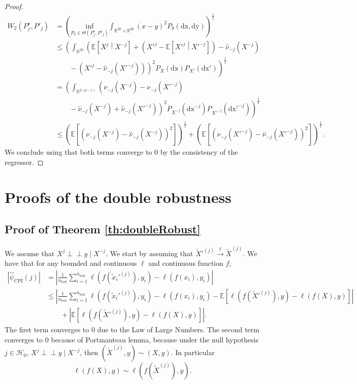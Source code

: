 \documentclass{article}
\theoremstyle{plain}
\theoremstyle{definition}
\theoremstyle{remark}
\newcommand{\e}[1]{\mathbb{E}\left[#1\right]  } %
\newcommand{\indep}{\perp\!\!\!\perp}
\begin{document}
\begin{proof}
    \begin{align*}
        W_2(P^\star_j, P'_j)&=\left(\underset{P_\theta\in\Theta(P^\star_j, P'_j)}{\mathrm{inf}}\int_{\mathbb{R}^{2p}\times \mathbb{R}^{2p}}(x-y)^2P_\theta(\mathrm{dx, dy})\right)^{\frac{1}{2}}\\
        &\leq \left(\int_{\mathbb{R}^{2p}}\left(\e{X^j\middle|X^{-j}}+\left(X'^j-\e{X'^j\middle|X'^{-j}}\right)-\widehat{\nu}_{-j}\left(X^{-j}\right)\right.\right.\\&\left.\left.\qquad-\left(X'^j-\widehat{\nu}_{-j}\left(X'^{-j}\right)\right)\right)^2P_X(\mathrm{dx})P_{X'}(\mathrm{dx}')\right)^{\frac{1}{2}}\\
        &= \left(\int_{\mathbb{R}^{2(p-1)}}\left(\nu_{-j}\left(X^{-j}\right)-\nu_{-j}\left(X'^{-j}\right)\right.\right.\\&\left.\left.\qquad-\widehat{\nu}_{-j}\left(X^{-j}\right)+\widehat{\nu}_{-j}\left(X'^{-j}\right)\right)^2P_{X^{-j}}(\mathrm{dx}^{-j})P_{X'^{-j}}(\mathrm{dx}'^{-j})\right)^{\frac{1}{2}}\\
        &\leq \left(\e{\left(\nu_{-j}\left(X^{-j}\right)-\widehat{\nu}_{-j}\left(X^{-j}\right)\right)^2}\right)^{\frac{1}{2}}+\left(\e{\left(\nu_{-j}\left(X'^{-j}\right)-\widehat{\nu}_{-j}\left(X'^{-j}\right)\right)^2}\right)^{\frac{1}{2}}.
    \end{align*}
    We conclude using that both terms converge to $0$ by the consistency of the regressor. 
\end{proof}

\section{Proofs of the double robustness}

\subsection{Proof of Theorem \ref{th:doubleRobust}}
We assume that $X^j \indep y \mid X^{-j}$. We start by assuming that $\widetilde{X}'^{(j)} \overset{\ell}{\to} \widetilde{X}^{(j)}$. 
We have that for any bounded and continuous $\ell$ and continuous function $f$, 
\begin{align*}
\left|\widehat{\psi}_\mathrm{CPI}(j)\right|&=\left| \frac{1}{n_{\mathrm{test}}}\sum_{i=1}^{n_{\mathrm{test}}}\ell\left(f(\widetilde{x}_{i}'^{(j)}),y_i\right)-\ell\left(f(x_{i}), y_i\right)\right|\\
&\leq \left| \frac{1}{n_{\mathrm{test}}}\sum_{i=1}^{n_{\mathrm{test}}}\ell\left(f(\widetilde{x}_{i}'^{(j)}),y_i\right)-\ell\left(f(x_{i}), y_i\right)-\e{\ell\left(f(\widetilde{X}'^{(j)}),y\right)-\ell\left(f(X), y\right)}\right|\\
&\qquad+\left|\e{\ell\left(f(\widetilde{X}'^{(j)}),y\right)-\ell\left(f(X), y\right)}\right|.
\end{align*}
The first term converges to 0 due to the Law of Large Numbers. The second term converges to 0 because of Portmanteau lemma, because under the null hypothesis $j\in \mathcal{H}_0$, $X^j \indep y \mid X^{-j}$, then $(\widetilde{X}^{(j)},y)\sim (X, y)$. In particular $$\ell\left(f(X), y\right)\sim \ell\left(f(\widetilde{X}^{(j)}), y\right).$$
\end{document}
